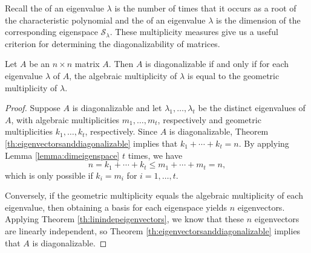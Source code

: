 \documentclass{ximera}
\begin{document}
  Recall the  of an eigenvalue $\lambda$ is the number of times that it occurs as a root of the characteristic polynomial and the  of an eigenvalue $\lambda$ is the dimension of the corresponding eigenspace $\mathcal{S}_\lambda$. These multiplicity measures give us a useful criterion for determining the diagonalizability of matrices. 
   
  \begin{theorem}\label{th:diagonalizability}
  Let $A$ be an $n \times n$ matrix $A$. Then $A$ is diagonalizable if and only if for each eigenvalue $\lambda$ of $A$, the algebraic multiplicity of $\lambda$ is equal to the geometric multiplicity of $\lambda$.
  \end{theorem}
   
  \begin{proof}
  Suppose $A$ is diagonalizable and let $\lambda_1, \ldots, \lambda_t$ be the distinct eigenvalues of $A$, with algebraic multiplicities $m_1, \ldots, m_t$, respectively and geometric multiplicities $k_1, \ldots, k_t$, respectively.  Since $A$ is diagonalizable, Theorem \ref{th:eigenvectorsanddiagonalizable} implies that $ k_1+\cdots+k_t=n$.  By applying Lemma \ref{lemma:dimeigenspace} $t$ times, we have
  $$n = k_1+\cdots+k_t \le m_1+\cdots+m_t = n,$$
  which is only possible if $k_i=m_i$ for $i=1,\ldots,t$.
   
  Conversely, if the geometric multiplicity equals the algebraic multiplicity of each eigenvalue, then obtaining a basis for each eigenspace yields $n$ eigenvectors.  Applying Theorem \ref{th:linindepeigenvectors}, we know that these $n$ eigenvectors are linearly independent, so Theorem \ref{th:eigenvectorsanddiagonalizable} implies that $A$ is diagonalizable.
  \end{proof}
\end{document}
